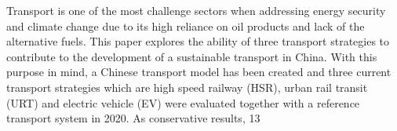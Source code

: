 Transport is one of the most challenge sectors when addressing energy security and climate change due to its high reliance on oil products and lack of the alternative fuels. This paper explores the ability of three transport strategies to contribute to the development of a sustainable transport in China. With this purpose in mind, a Chinese transport model has been created and three current transport strategies which are high speed railway (HSR), urban rail transit (URT) and electric vehicle (EV) were evaluated together with a reference transport system in 2020. As conservative results, 13%